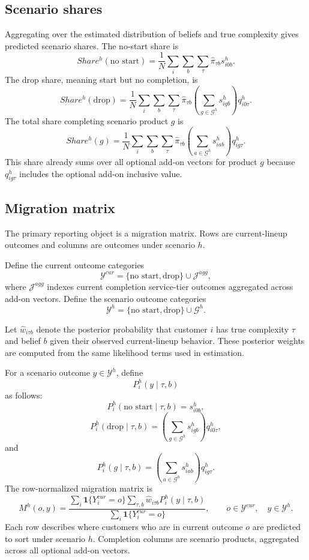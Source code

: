 \documentclass[11pt]{article}
\newcommand{\J}{\mathcal{J}}
\newcommand{\G}{\mathcal{G}}
\newcommand{\Yset}{\mathcal{Y}}
\newcommand{\one}{\mathbf{1}}
\begin{document}
\subsection*{Scenario shares}

Aggregating over the estimated distribution of beliefs and true complexity gives predicted scenario shares. The no-start share is
\[
Share^{h}(\text{no start})
=
\frac{1}{N}\sum_i\sum_b\sum_\tau \widehat\pi_{\tau b}s_{i0b}^{h}.
\]
The drop share, meaning start but no completion, is
\[
Share^{h}(\text{drop})
=
\frac{1}{N}\sum_i\sum_b\sum_\tau
\widehat\pi_{\tau b}
\left(\sum_{g\in\G^h}s_{igb}^{h}\right)
q_{i0\tau}^{h}.
\]
The total share completing scenario product $g$ is
\[
Share^{h}(g)
=
\frac{1}{N}\sum_i\sum_b\sum_\tau
\widehat\pi_{\tau b}
\left(\sum_{a\in\G^h}s_{iab}^{h}\right)
q_{ig\tau}^{h}.
\]
This share already sums over all optional add-on vectors for product $g$ because $q_{ig\tau}^{h}$ includes the optional add-on inclusive value.

\subsection*{Migration matrix}

The primary reporting object is a migration matrix. Rows are current-lineup outcomes and columns are outcomes under scenario $h$.

Define the current outcome categories
\[
\Yset^{cur}=\{\text{no start},\text{drop}\}\cup\J^{agg},
\]
where $\J^{agg}$ indexes current completion service-tier outcomes aggregated across add-on vectors. Define the scenario outcome categories
\[
\Yset^{h}=\{\text{no start},\text{drop}\}\cup\G^h.
\]

Let $\widehat w_{i\tau b}$ denote the posterior probability that customer $i$ has true complexity $\tau$ and belief $b$ given their observed current-lineup behavior. These posterior weights are computed from the same likelihood terms used in estimation.

For a scenario outcome $y\in\Yset^h$, define
\[
P_i^h(y\mid \tau,b)
\]
as follows:
\[
P_i^h(\text{no start}\mid \tau,b)=s_{i0b}^h,
\]
\[
P_i^h(\text{drop}\mid \tau,b)=
\left(\sum_{g\in\G^h}s_{igb}^h\right)q_{i0\tau}^h,
\]
and
\[
P_i^h(g\mid \tau,b)=
\left(\sum_{a\in\G^h}s_{iab}^h\right)q_{ig\tau}^h.
\]
The row-normalized migration matrix is
\[
M^h(o,y)
=
\frac{
\sum_i \one\{Y_i^{cur}=o\}
\sum_{\tau,b}\widehat w_{i\tau b}P_i^h(y\mid \tau,b)
}{
\sum_i \one\{Y_i^{cur}=o\}
},
\qquad
o\in\Yset^{cur},\quad y\in\Yset^h.
\]
Each row describes where customers who are in current outcome $o$ are predicted to sort under scenario $h$. Completion columns are scenario products, aggregated across all optional add-on vectors.
\end{document}
